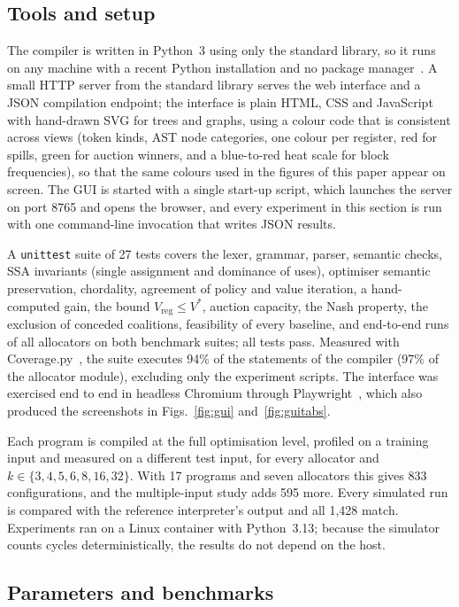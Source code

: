 \documentclass{ieeeaccess}
\begin{document}
\subsection{Tools and setup}

The compiler is written in Python~3 using only the standard library, so
it runs on any machine with a recent Python installation and no package
manager~\cite{python}. A small HTTP server from the standard library
serves the web interface and a JSON compilation endpoint; the interface
is plain HTML, CSS and JavaScript with hand-drawn SVG for trees and
graphs, using a colour code that is consistent across views (token
kinds, AST node categories, one colour per register, red for spills,
green for auction winners, and a blue-to-red heat scale for block
frequencies), so that the same colours used in the figures of this
paper appear on screen. The GUI is started with a single start-up
script, which launches the server on port 8765 and opens the browser,
and every experiment in this section is run with one command-line
invocation that writes JSON results.

A \texttt{unittest} suite of 27 tests covers the lexer, grammar, parser,
semantic checks, SSA invariants (single assignment and dominance of
uses), optimiser semantic preservation, chordality, agreement of policy
and value iteration, a hand-computed gain, the bound
$V_{\mathrm{reg}}\le V^\ast$, auction capacity, the Nash property, the
exclusion of conceded coalitions, feasibility of every baseline, and
end-to-end runs of all allocators on both benchmark suites; all tests
pass. Measured with Coverage.py~\cite{coveragepy}, the suite executes
94\% of the statements of the compiler (97\% of the allocator module),
excluding only the experiment scripts. The interface was exercised end to end in headless
Chromium through Playwright~\cite{playwright}, which also produced the
screenshots in Figs.~\ref{fig:gui} and~\ref{fig:guitabs}.

Each program is compiled at the full optimisation level, profiled on a
training input and measured on a different test input, for every
allocator and $k\in\{3,4,5,6,8,16,32\}$. With 17 programs and seven
allocators this gives 833 configurations, and the multiple-input study
adds 595 more. Every simulated run is compared with the reference
interpreter's output and all 1{,}428 match. Experiments ran on a Linux
container with Python~3.13; because the simulator counts cycles
deterministically, the results do not depend on the host.

\subsection{Parameters and benchmarks}
\label{sec:params}
\end{document}
